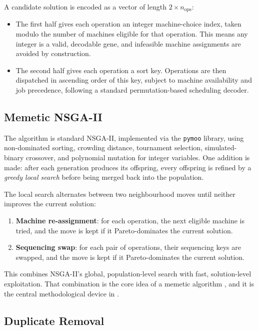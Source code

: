 \documentclass[11pt,a4paper]{article}
\begin{document}
A candidate solution is encoded as a vector of length $2 \times n_{\text{ops}}$:
\begin{itemize}
    \item The first half gives each operation an integer machine-choice index, taken modulo the
    number of machines eligible for that operation. This means any integer is a valid, decodable
    gene, and infeasible machine assignments are avoided by construction.
    \item The second half gives each operation a sort key. Operations are then dispatched in
    ascending order of this key, subject to machine availability and job precedence, following a
    standard permutation-based scheduling decoder.
\end{itemize}

\subsection{Memetic NSGA-II}
\label{subsec:memetic-nsga2}

The algorithm is standard NSGA-II, implemented via the \texttt{pymoo} library, using non-dominated
sorting, crowding distance, tournament selection, simulated-binary crossover, and polynomial mutation
for integer variables. One addition is made: after each generation produces its offspring, every
offspring is refined by a \emph{greedy local search} before being merged back into the population.

The local search alternates between two neighbourhood moves until neither improves the current
solution:
\begin{enumerate}[label=\arabic*.]
    \item \textbf{Machine re-assignment}: for each operation, the next eligible machine is tried,
    and the move is kept if it Pareto-dominates the current solution.
    \item \textbf{Sequencing swap}: for each pair of operations, their sequencing keys are swapped,
    and the move is kept if it Pareto-dominates the current solution.
\end{enumerate}

This combines NSGA-II's global, population-level search with fast, solution-level exploitation. That
combination is the core idea of a memetic algorithm \citep{moscato2003gentle}, and it is the central
methodological device in \citet{burmeister2024memetic}.

\subsection{Duplicate Removal}
\label{subsec:duplicate-removal}
\end{document}
